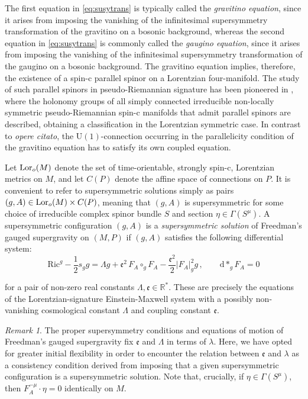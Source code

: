 \documentclass[10pt,a4paper,twoside,reqno]{amsart}
\theoremstyle{plain}
\theoremstyle{definition}
\theoremstyle{remark}
\newtheorem{remark}[thm]{Remark}
\def\dd{\mathrm{d}}
\def\U{\mathrm{U}}
\newcommand{\Lor}{{\rm Lor}}
\def\dd{\mathrm{d}}
\begin{document}
\noindent
The first equation in \eqref{eq:susytrans} is typically called the \emph{gravitino equation}, since it arises from imposing the vanishing of the infinitesimal supersymmetry transformation of the gravitino on a bosonic background, whereas the second equation in \eqref{eq:susytrans} is commonly called the \emph{gaugino equation}, since it arises from imposing the vanishing of the infinitesimal supersymmetry transformation of the gaugino on a bosonic background. The gravitino equation implies, therefore, the existence of a spin-c parallel spinor on a Lorentzian four-manifold. The study of such parallel spinors in pseudo-Riemannian signature has been pioneered in \cite{Ikemakhen06,Ikemakhen07}, where the holonomy groups of all simply connected irreducible non-locally symmetric pseudo-Riemannian spin-c manifolds that admit parallel spinors are described, obtaining a classification in the Lorentzian symmetric case. In contrast to \emph{opere citato}, the $\U(1)$-connection occurring in the parallelicity condition of the gravitino equation has to satisfy its own coupled equation.\medskip

Let $\Lor_o(M)$ denote the set of time-orientable, strongly spin-c, Lorentzian metrics on $M$, and let $C(P)$ denote the affine space of connections on $P$. It is convenient to refer to supersymmetric solutions simply as pairs $(g,A)\in \Lor_o(M)\times C(P)$, meaning that $(g,A)$ is supersymmetric for some choice of irreducible complex spinor bundle $S$ and section $\eta\in \Gamma(S^{\mu})$. A supersymmetric configuration $(g,A)$ is a \emph{supersymmetric solution} of Freedman's gauged supergravity on $(M,P)$ if $(g,A)$ satisfies the following differential system:
\begin{equation}
\label{eq:Freedmaneqs}
\mathrm{Ric}^g - \frac{1}{2} s_g g  = \Lambda g + \mathfrak{e}^2\, F_A \circ_g F_A - \frac{\mathfrak{e}^2}{2}  \vert F_A \vert^2_g g\, , \qquad \dd \ast_g F_A =0 
\end{equation}

\noindent
for a pair of non-zero real constants $\Lambda, \mathfrak{e}\in\mathbb{R}^{\ast}$. These are precisely the equations of the Lorentzian-signature Einstein-Maxwell system with a possibly non-vanishing cosmological constant $\Lambda$ and coupling constant $\mathfrak{e}$.

\begin{remark}
The proper supersymmetry conditions and equations of motion of Freedman's gauged supergravity fix $\mathfrak{e}$ and $\Lambda$ in terms of $\lambda$. Here, we have opted for greater initial flexibility in order to encounter the relation between $\mathfrak{e}$ and $\lambda$ as a consistency condition derived from imposing that a given supersymmetric configuration is a supersymmetric solution. Note that, crucially, if $\eta\in \Gamma(S^{\mu})$, then $F_A^{-\mu} \cdot \eta = 0$ identically on $M$.     
\end{remark}
\end{document}
